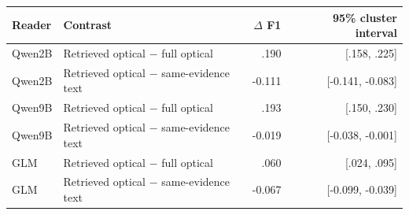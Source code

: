 \begin{tabular}{llrr}
\toprule
Reader & Contrast & $\Delta$ F1 & 95\% cluster interval \\
\midrule
Qwen2B & Retrieved optical $-$ full optical & .190 & [.158, .225] \\
Qwen2B & Retrieved optical $-$ same-evidence text & -0.111 & [-0.141, -0.083] \\
Qwen9B & Retrieved optical $-$ full optical & .193 & [.150, .230] \\
Qwen9B & Retrieved optical $-$ same-evidence text & -0.019 & [-0.038, -0.001] \\
GLM & Retrieved optical $-$ full optical & .060 & [.024, .095] \\
GLM & Retrieved optical $-$ same-evidence text & -0.067 & [-0.099, -0.039] \\
\bottomrule
\end{tabular}
